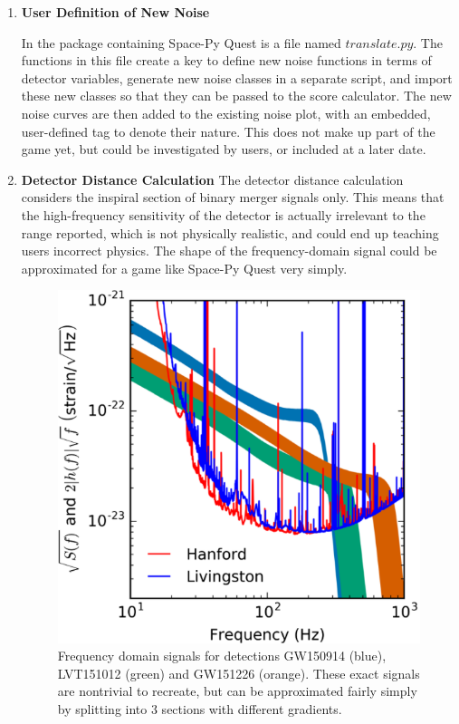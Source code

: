 \documentclass{article}
\begin{document}
\begin{enumerate}
        \item \textbf{User Definition of New Noise} \par
    In the package containing Space-Py Quest is a file named $translate.py$. The functions in this file create a key to define new noise functions in terms of detector variables, generate new noise classes in a separate script, and import these new classes so that they can be passed to the score calculator. The new noise curves are then added to the existing noise plot, with an embedded, user-defined tag to denote their nature. This does not make up part of the game yet, but could be investigated by users, or included at a later date.
    \item \textbf{Detector Distance Calculation}
    The detector distance calculation considers the inspiral section of binary merger signals only. This means that the high-frequency sensitivity of the detector is actually irrelevant to the range reported, which is not physically realistic, and could end up teaching users incorrect physics. The shape of the frequency-domain signal could be approximated for a game like Space-Py Quest very simply. 
\par
    \begin{figure}
    \centering
    \includegraphics[scale=0.6]{fdomsig.PNG}
    \caption{Frequency domain signals for detections GW150914 (blue), LVT151012 (green) and GW151226 (orange). These exact signals are nontrivial to recreate, but can be approximated fairly simply by splitting into 3 sections with different gradients. \cite{binary}}

\end{figure}
\end{enumerate}
\end{document}
